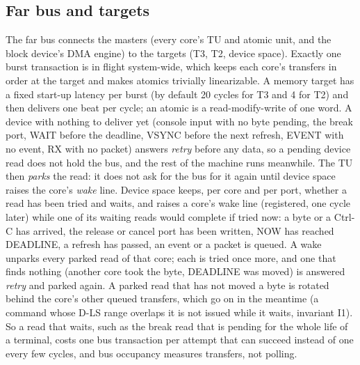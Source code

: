 \subsection{Far bus and targets}
The far bus connects the masters (every core's TU and atomic unit, and the block device's DMA engine) to
the targets (T3, T2, device space). Exactly one burst transaction is in flight system-wide, which keeps
each core's transfers in order at the target and makes atomics trivially linearizable. A memory target
has a fixed start-up latency per burst (by default 20 cycles for T3 and 4 for T2) and then delivers one
beat per cycle; an atomic is a read-modify-write of one word. A device with nothing to deliver yet
(console input with no byte pending, the break port, WAIT before the deadline, VSYNC before the next
refresh, EVENT with no event, RX with no packet) answers \emph{retry} before any data, so a pending
device read does not hold the bus, and the rest of the machine runs meanwhile. The TU then
\emph{parks} the read: it does not ask for the bus for it again until device space raises the core's
\emph{wake} line. Device space keeps, per core and per port, whether a read has been tried and waits,
and raises a core's wake line (registered, one cycle later) while one of its waiting reads would
complete if tried now: a byte or a Ctrl-C has arrived, the release or cancel port has been written, NOW
has reached DEADLINE, a refresh has passed, an event or a packet is queued. A wake unparks every parked
read of that core; each is tried once more, and one that finds nothing (another core took the byte,
DEADLINE was moved) is answered \emph{retry} and parked again. A parked read that has not moved a byte
is rotated behind the core's other queued transfers, which go on in the meantime (a command whose
D-LS range overlaps it is not issued while it waits, invariant I1). So a read that waits, such as the
break read that is pending for the whole life of a terminal, costs one bus transaction per attempt
that can succeed instead of one every few cycles, and bus occupancy measures transfers, not polling.

